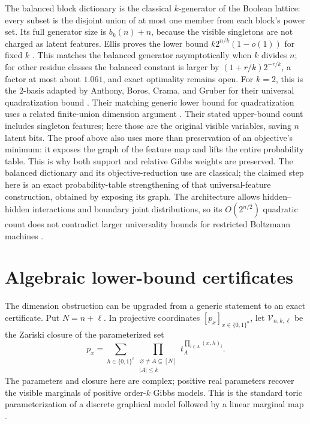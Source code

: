 \documentclass{article}
\newcommand{\bits}{\{0,1\}}
\begin{document}
The balanced block dictionary is the classical $k$-generator of the Boolean
lattice: every subset is the disjoint union of at most one member from each
block's power set.  Its full generator size is $b_k(n)+n$, because the visible
singletons are not charged as latent features.  Ellis proves the lower bound
$k2^{n/k}(1-o(1))$ for fixed $k$ \cite[Theorem~5]{ellis09}.  This matches the
balanced generator asymptotically when $k$ divides $n$; for other residue
classes the balanced constant is larger by
$(1+r/k)2^{-r/k}$, a factor at most about $1.061$, and exact optimality remains
open.  For $k=2$, this is the $2$-basis adapted by
Anthony, Boros, Crama, and Gruber for their universal quadratization bound
\cite[Theorems~4--5 and Remark~2]{anthony17}.  Their matching generic lower
bound for quadratization uses a related finite-union dimension argument
\cite[Theorem~1]{anthony17}.  Their stated upper-bound count includes singleton
features; here those are the original visible variables, saving $n$ latent
bits.  The proof above also uses more than preservation of an objective's
minimum: it exposes the graph of the feature map and lifts the entire
probability table.  This is why both support and relative Gibbs weights are
preserved.  The balanced dictionary and its objective-reduction use are
classical; the claimed step here is an exact probability-table strengthening
of that universal-feature construction, obtained by exposing its graph.  The
architecture allows hidden--hidden interactions and boundary joint
distributions, so its $O(2^{n/2})$ quadratic count does not contradict larger
universality bounds for restricted Boltzmann machines
\cite{montufaray11,montufarmorton15drbm}.

\section{Algebraic lower-bound certificates}
\label{sec:algebraic-certificates}

The dimension obstruction can be upgraded from a generic statement to an
exact certificate.  Put $N=n+\ell$.  In projective coordinates
$[p_x]_{x\in\bits^n}$, let $\mathcal V_{n,k,\ell}$ be the Zariski closure of
the parameterized set
\[
  p_x
  =\sum_{h\in\bits^\ell}
    \prod_{\substack{\varnothing\ne A\subseteq[N]\\|A|\le k}}
      t_A^{\prod_{i\in A}(x,h)_i}.
\]
The parameters and closure here are complex; positive real parameters recover
the visible marginals of positive order-$k$ Gibbs models.  This is the standard
toric parameterization of a discrete graphical model followed by a linear
marginal map \cite{geiger06}.
\end{document}
